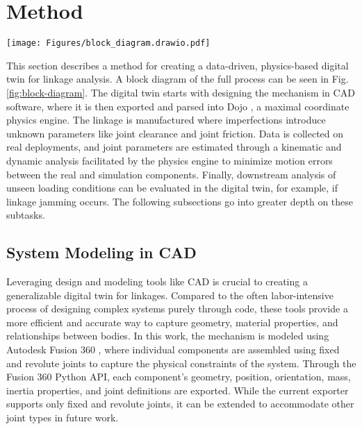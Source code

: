 \section{Method} \label{method}
\begin{figure*}
    \centering
    \texttt{[image: Figures/block\_diagram.drawio.pdf]}
    \caption{A block diagram illustrating the data-driven, physics-based digital twin pipeline for linkage analysis. The process begins with a CAD model, exported to the physics engine for rigid body simulation. Simultaneously, real-world data is captured through various sensors (e.g., video, motion capture, and other sensing technologies) and synthesized using methods like optical flow or Kalman filters to estimate joint positions. The synthesized data undergoes kinematic analysis to estimate joint clearance, followed by dynamic analysis to estimate joint friction. These parameters are fed back into the physics engine for downstream analysis, including simulations of unseen loading conditions, jamming detection, and evaluating force/torque requirements.}
    \label{fig:block-diagram}
\end{figure*}

This section describes a method for creating a data-driven, physics-based digital twin for linkage analysis. A block diagram of the full process can be seen in Fig. \ref{fig:block-diagram}. The digital twin starts with designing the mechanism in CAD software, where it is then exported and parsed into Dojo \cite{howell_dojo_2022}, a maximal coordinate physics engine. The linkage is manufactured where imperfections introduce unknown parameters like joint clearance and joint friction. Data is collected on real deployments, and joint parameters are estimated through a kinematic and dynamic analysis facilitated by the physics engine to minimize motion errors between the real and simulation components. Finally, downstream analysis of unseen loading conditions can be evaluated in the digital twin, for example, if linkage jamming occurs. The following subsections go into greater depth on these subtasks.   

\subsection{System Modeling in CAD}

Leveraging design and modeling tools like CAD is crucial to creating a generalizable digital twin for linkages. Compared to the often labor-intensive process of designing complex systems purely through code, these tools provide a more efficient and accurate way to capture geometry, material properties, and relationships between bodies. In this work, the mechanism is modeled using Autodesk Fusion 360 \cite{autodesk_fusion_2014}, where individual components are assembled using fixed and revolute joints to capture the physical constraints of the system. Through the Fusion 360 Python API, each component's geometry, position, orientation, mass, inertia properties, and joint definitions are exported. While the current exporter supports only fixed and revolute joints, it can be extended to accommodate other joint types in future work.

